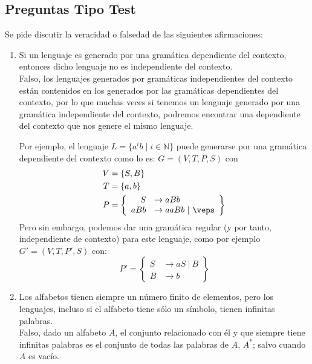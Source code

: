 \subsection{Preguntas Tipo Test}
Se pide discutir la veracidad o falsedad de las siguientes afirmaciones:
\begin{enumerate}
    \item Si un lenguaje es generado por una gramática dependiente del contexto, entonces dicho lenguaje no es independiente del contexto.\\

        Falso, los lenguajes generados por gramáticas independientes del contexto están contenidos en los generados por las gramáticas dependientes del contexto, por lo que muchas veces si tenemos un lenguaje generado por una gramática independiente del contexto, podremos encontrar una dependiente del contexto que nos genere el mismo lenguaje. 

        Por ejemplo, el lenguaje $L=\{a^ib \mid i \in \mathbb{N}\}$ puede generarse por una gramática dependiente del contexto como lo es: $G=(V, T, P, S)$ con
        \begin{align*}
            V &= \{S,B\} \\
            T &= \{a,b\} \\
            P &= \left\{\begin{array}{rl}
                    S &\rightarrow aBb \\
                    aBb &\rightarrow aaBb\ |\ \veps
            \end{array}\right\}
        \end{align*}
        Pero sin embargo, podemos dar una gramática regular (y por tanto, independiente de contexto) para este lenguaje, como por ejemplo $G'=(V, T, P', S)$ con:
        \begin{equation*}
            P' = \left\{\begin{array}{rl}
                    S &\rightarrow aS\ |\ B \\
                    B &\rightarrow b
            \end{array}\right\}
        \end{equation*}
    \item Los alfabetos tienen siempre un número finito de elementos, pero los lenguajes, incluso si el alfabeto tiene sólo un símbolo, tienen infinitas palabras.\\

        Falso, dado un alfabeto $A$, el conjunto relacionado con él y que siempre tiene infinitas palabras es el conjunto de todas las palabras de $A$, $A^\ast$; salvo cuando $A$ es vacío.


\end{enumerate}
